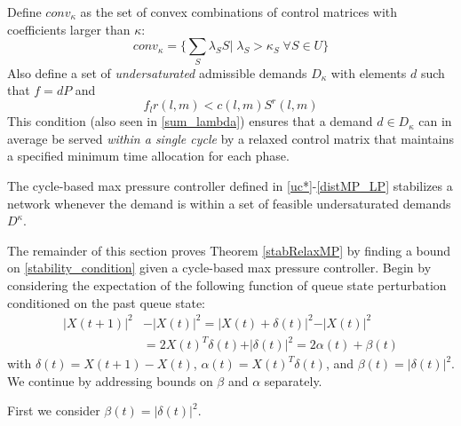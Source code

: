 Define $conv_{\kappa}$ as the set of convex combinations of control matrices with coefficients larger than $\kappa$:
\begin{equation}
conv_{\kappa} = \Big\{ \sum_{S}\lambda_{S}S \big| \; \lambda_S > \kappa_S \; \forall S\in U\Big\}
\end{equation}
Also define a set of \emph{undersaturated} admissible demands $D_{\kappa}$ with elements $d$ such that $f=dP$ and 
\begin{equation}\label{admissible_relaxed}
 f_{l}r(l,m) < c(l,m)S^r(l,m) 
 \end{equation} 
This condition (also seen in \eqref{sum_lambda}) ensures that a demand $d\in D_{\kappa}$ can in average be served \emph{within a single cycle} by a relaxed control matrix that maintains a specified minimum time allocation for each phase. 
\begin{Thm}\label{stabRelaxMP}
The cycle-based max pressure controller defined in \eqref{uc*}-\eqref{distMP_LP} 
stabilizes a network whenever the demand is within a set of feasible undersaturated demands $D^{\kappa}$.
\end{Thm}
The remainder of this section proves Theorem \ref{stabRelaxMP} by finding a bound on \eqref{stability_condition} given a cycle-based max pressure controller. Begin by considering the expectation of the following function of queue state perturbation conditioned on the past queue state:
\begin{align} \label{alpha_beta_defs}
\vert X(t+1) \vert^2 & - \vert X(t)\vert^2 = \vert X(t) + \delta (t) \vert^2 - \vert X(t)\vert^2 \\
\nonumber &= 2X(t)^{T}\delta(t) + \vert \delta(t)  \vert^2 = 2\alpha(t) + \beta(t) 
\end{align}
with $\delta(t) = X(t+1) - X(t)$, $\alpha(t)  = X(t)^{T}\delta(t)$, and  $\beta(t) = \vert \delta (t) \vert^{2}$.
We continue by addressing bounds on $\beta$ and $\alpha$ separately. 

First we consider $\beta(t) = \vert \delta (t)\vert^{2}$.

